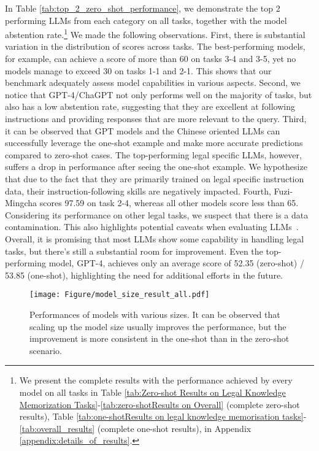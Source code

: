 In Table \ref{tab:top_2_zero_shot_performance}, we demonstrate the top 2 performing LLMs from each category on all tasks, together with the model abstention rate.\footnote{We present the complete results with the performance achieved by every model on all tasks in Table \ref{tab:Zero-shot Results on Legal Knowledge Memorization Tasks}-\ref{tab:zero-shotResults on Overall} (complete zero-shot results), Table \ref{tab:one-shotResults on legal knowledge memorisation tasks}-\ref{tab:overall_results} (complete one-shot results), in Appendix \ref{appendix:details_of_results}.} We made the following observations. First, there is substantial variation in the distribution of scores across tasks. The best-performing models, for example, can achieve a score of more than 60 on tasks 3-4 and 3-5, yet no models manage to exceed 30 on tasks 1-1 and 2-1. This shows that our benchmark adequately assess model capabilities in various aspects. Second, we notice that GPT-4/ChaGPT not only performs well on the majority of tasks, but also has a low abstention rate, suggesting that they are excellent at following instructions and providing responses that are more relevant to the query. Third, it can be observed that GPT models and the Chinese oriented LLMs can successfully leverage the one-shot example and make more accurate predictions compared to zero-shot cases. The top-performing legal specific LLMs, however, suffers a drop in performance after seeing the one-shot example. We hypothesize that due to the fact that they are primarily trained on legal specific instruction data, their instruction-following skills are negatively impacted. Fourth, Fuzi-Mingcha scores 97.59 on task 2-4, whereas all other models score less than 65. Considering its performance on other legal tasks, we suspect that there is a data contamination. This also highlights potential caveats when evaluating LLMs~\cite{schaeffer2023pretraining}. Overall, it is promising that most LLMs show some capability in handling legal tasks, but there's still a substantial room for improvement. Even the top-performing model, GPT-4, achieves only an average score of 52.35 (zero-shot) / 53.85 (one-shot), highlighting the need for additional efforts in the future.

\begin{figure}[t]
    \centering
    \texttt{[image: Figure/model\_size\_result\_all.pdf]}
    \caption{\small Performances of models with various sizes. It can be observed that scaling up the model size usually improves the performance, but the improvement is more consistent in the one-shot than in the zero-shot scenario. }
    \label{fig:effects_scale}
\end{figure}

